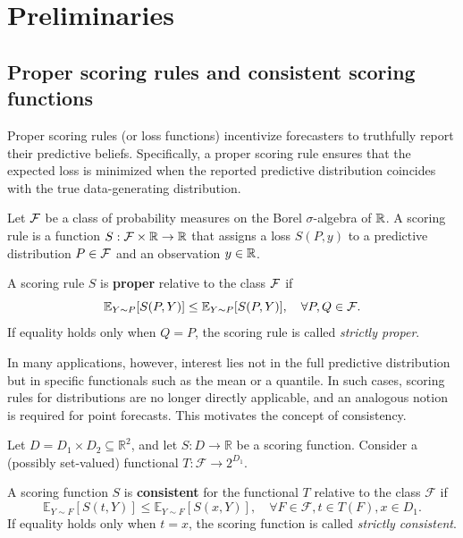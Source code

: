 \section{Preliminaries} \label{sec:preliminaries}

\subsection{Proper scoring rules and consistent scoring functions}
Proper scoring rules (or loss functions) incentivize forecasters to truthfully report their predictive beliefs. Specifically, a proper scoring rule ensures that the expected loss is minimized when the reported predictive distribution coincides with the true data-generating distribution.

Let $\mathcal{F}$ be a class of probability measures on the Borel $\sigma$-algebra of $\mathbb{R}$. A scoring rule is a function $S : \mathcal{F} \times \mathbb{R} \to \mathbb{R}$ that assigns a loss $S(P,y)$ to a predictive distribution $P \in \mathcal{F}$ and an observation $y \in \mathbb{R}$.

\begin{defi}\label{def:proper_scoring_rule}
A scoring rule $S$ is \textbf{proper} relative to the class $\mathcal{F}$ if
\[
\mathbb{E}_{Y\sim P}[S(P,Y)] \leq \mathbb{E}_{Y\sim P}[S(P,Y)], \quad \forall P, Q \in \mathcal{F}.
\]
If equality holds only when $Q = P$, the scoring rule is called \emph{strictly proper}.
\end{defi}

In many applications, however, interest lies not in the full predictive distribution but in specific functionals such as the mean or a quantile. In such cases, scoring rules for distributions are no longer directly applicable, and an analogous notion is required for point forecasts. This motivates the concept of consistency.

Let $D = D_1 \times D_2 \subseteq \mathbb{R}^2$, and let $S : D \to \mathbb{R}$ be a scoring function. Consider a (possibly set-valued) functional $T : \mathcal{F} \to 2^{D_1}$.

\begin{defi}\label{def:consistency}
A scoring function $S$ is \textbf{consistent} for the functional $T$ relative to the class $\mathcal{F}$ if
\[
\mathbb{E}_{Y\sim F}[S(t,Y)] \leq \mathbb{E}_{Y\sim F}[S(x,Y)], \quad \forall F \in \mathcal{F}, t \in T(F), x \in D_1.
\]
If equality holds only when $t = x$, the scoring function is called \emph{strictly consistent}.
\end{defi}

